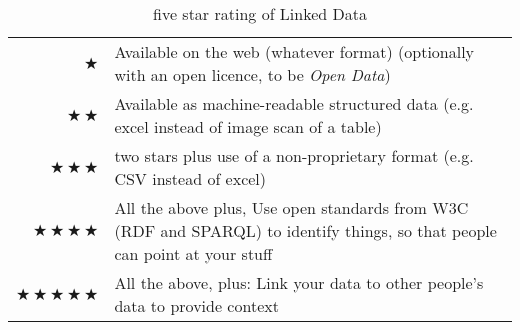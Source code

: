   \begin{table}[htb]
  	\small
  	\caption{five star rating of Linked Data}
	\begin{tabular}{rp{}}
$\bigstar$ & Available on the web (whatever format) (optionally with an open licence, to be \textit{Open Data}) \\ 
$\bigstar\,\bigstar$ & Available as machine-readable structured data (e.g. excel instead of image scan of a table) \\ 
$\bigstar\,\bigstar\,\bigstar$ &  two stars plus use of a non-proprietary format (e.g. CSV instead of excel) \\ 
$\bigstar\,\bigstar\,\bigstar\,\bigstar$ & All the above plus, Use open standards from W3C (RDF and SPARQL) to identify things, so that people can point at your stuff \\ 
$\bigstar\,\bigstar\,\bigstar\,\bigstar\,\bigstar$ & All the above, plus: Link your data to other people’s data to provide context
    \end{tabular}
  \end{table}


